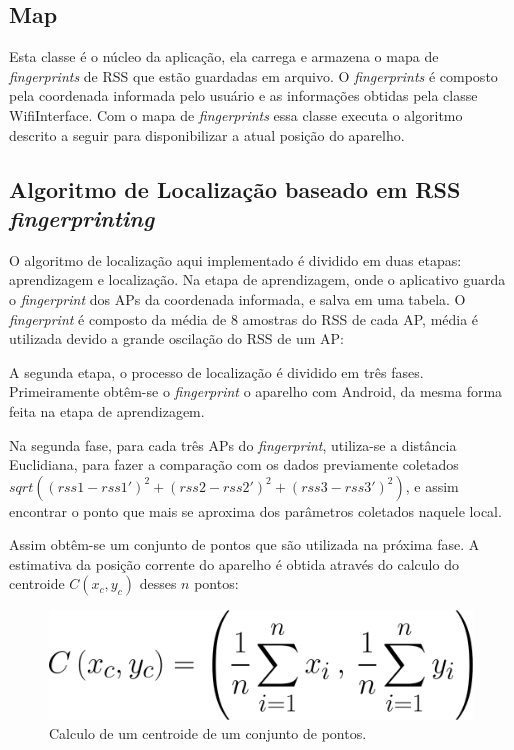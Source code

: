   \subsection{Map}
  Esta classe é o núcleo da aplicação, ela carrega e armazena o mapa de \textit{fingerprints} de RSS que estão 
  guardadas em arquivo. 
  O \textit{fingerprints} é composto 
  pela coordenada informada pelo usuário e as informações obtidas pela classe WifiInterface. 
  Com o mapa de \textit{fingerprints} essa classe executa o algoritmo descrito a seguir para disponibilizar 
  a atual posição do aparelho.
   
  \subsection{Algoritmo de Localização baseado em RSS \textit{fingerprinting}}
  
  O algoritmo de localização aqui implementado é dividido em duas etapas: aprendizagem e localização. Na etapa de aprendizagem, 
  onde o aplicativo guarda o \textit{fingerprint} dos APs da coordenada informada,
  e salva em uma tabela. O \textit{fingerprint} é composto da média de 8 amostras do RSS de cada AP, média é utilizada 
  devido a grande oscilação do RSS de um AP:
  
  A segunda etapa, o processo de localização é dividido em três fases. Primeiramente obtêm-se o \textit{fingerprint}
  o aparelho com Android, da mesma forma feita na etapa de aprendizagem. 
  
  Na segunda fase, para cada três APs do \textit{fingerprint}, utiliza-se a distância Euclidiana, para fazer a comparação com os 
  dados previamente coletados $sqrt((rss1-rss1')^{2}+(rss2-rss2')^{2}+(rss3-rss3')^{2})$, 
e assim encontrar o ponto que mais se aproxima dos parâmetros coletados naquele local. 

  Assim obtêm-se um conjunto de pontos que são utilizada na próxima fase. 
  A estimativa da posição corrente do aparelho é obtida através do calculo do centroide $C(x_c,y_c)$ desses $n$ pontos: 

  \begin{figure}[ht]
  \centering
  \includegraphics[scale=0.23]{images/centroid.png}
  \caption{Calculo de um centroide de um conjunto de pontos.}
  \label{fig:centroidFormula}
  \end{figure}
  

